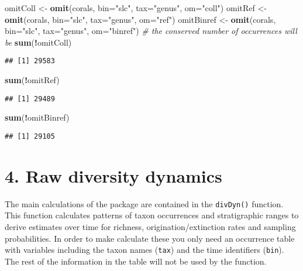 \documentclass[]{article}
\newenvironment{Shaded}{\begin{snugshade}}{\end{snugshade}}
\newcommand{\CommentTok}[1]{\textcolor[rgb]{0.56,0.35,0.01}{\textit{#1}}}
\newcommand{\DataTypeTok}[1]{\textcolor[rgb]{0.13,0.29,0.53}{#1}}
\newcommand{\KeywordTok}[1]{\textcolor[rgb]{0.13,0.29,0.53}{\textbf{#1}}}
\newcommand{\NormalTok}[1]{#1}
\newcommand{\OperatorTok}[1]{\textcolor[rgb]{0.81,0.36,0.00}{\textbf{#1}}}
\newcommand{\StringTok}[1]{\textcolor[rgb]{0.31,0.60,0.02}{#1}}
\begin{document}
\begin{Shaded}
\begin{Highlighting}[]
\NormalTok{omitColl <-}\StringTok{ }\KeywordTok{omit}\NormalTok{(corals, }\DataTypeTok{bin=}\StringTok{"slc"}\NormalTok{, }\DataTypeTok{tax=}\StringTok{"genus"}\NormalTok{, }\DataTypeTok{om=}\StringTok{"coll"}\NormalTok{)}
\NormalTok{omitRef <-}\StringTok{ }\KeywordTok{omit}\NormalTok{(corals, }\DataTypeTok{bin=}\StringTok{"slc"}\NormalTok{, }\DataTypeTok{tax=}\StringTok{"genus"}\NormalTok{, }\DataTypeTok{om=}\StringTok{"ref"}\NormalTok{)}
\NormalTok{omitBinref <-}\StringTok{ }\KeywordTok{omit}\NormalTok{(corals, }\DataTypeTok{bin=}\StringTok{"slc"}\NormalTok{, }\DataTypeTok{tax=}\StringTok{"genus"}\NormalTok{, }\DataTypeTok{om=}\StringTok{"binref"}\NormalTok{)}
\CommentTok{# the conserved number of occurrences will be}
\KeywordTok{sum}\NormalTok{(}\OperatorTok{!}\NormalTok{omitColl)}
\end{Highlighting}
\end{Shaded}

\begin{verbatim}
## [1] 29583
\end{verbatim}

\begin{Shaded}
\begin{Highlighting}[]
\KeywordTok{sum}\NormalTok{(}\OperatorTok{!}\NormalTok{omitRef)}
\end{Highlighting}
\end{Shaded}

\begin{verbatim}
## [1] 29489
\end{verbatim}

\begin{Shaded}
\begin{Highlighting}[]
\KeywordTok{sum}\NormalTok{(}\OperatorTok{!}\NormalTok{omitBinref)}
\end{Highlighting}
\end{Shaded}

\begin{verbatim}
## [1] 29105
\end{verbatim}

\hypertarget{raw-diversity-dynamics}{%
\section{4. Raw diversity dynamics}\label{raw-diversity-dynamics}}

The main calculations of the package are contained in the
\texttt{divDyn()} function. This function calculates patterns of taxon
occurrences and stratigraphic ranges to derive estimates over time for
richness, origination/extinction rates and sampling probabilities. In
order to make calculate these you only need an occurrence table with
variables including the taxon names (\texttt{tax}) and the time
identifiers (\texttt{bin}). The rest of the information in the table
will not be used by the function.
\end{document}
